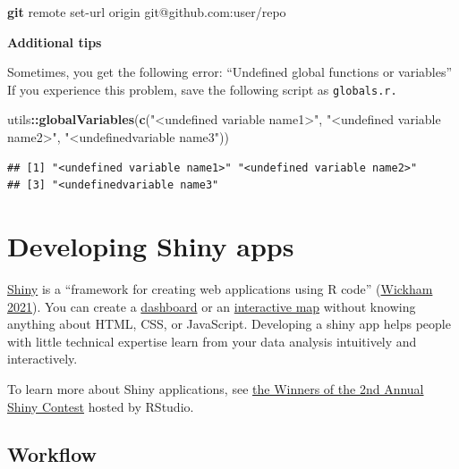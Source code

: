 \documentclass[
]{book}
\newenvironment{Shaded}{\begin{snugshade}}{\end{snugshade}}
\newcommand{\FunctionTok}[1]{\textcolor[rgb]{0.13,0.29,0.53}{\textbf{#1}}}
\newcommand{\NormalTok}[1]{#1}
\newcommand{\SpecialCharTok}[1]{\textcolor[rgb]{0.81,0.36,0.00}{\textbf{#1}}}
\newcommand{\StringTok}[1]{\textcolor[rgb]{0.31,0.60,0.02}{#1}}
\begin{document}
\begin{Shaded}
\begin{Highlighting}[]
\FunctionTok{git}\NormalTok{ remote set{-}url origin git@github.com:user/repo }
\end{Highlighting}
\end{Shaded}

\textbf{Additional tips}

Sometimes, you get the following error: ``Undefined global functions or variables'' If you experience this problem, save the following script as \texttt{globals.r.}

\begin{Shaded}
\begin{Highlighting}[]
\NormalTok{utils}\SpecialCharTok{::}\FunctionTok{globalVariables}\NormalTok{(}\FunctionTok{c}\NormalTok{(}\StringTok{"\textless{}undefined variable name1\textgreater{}"}\NormalTok{, }\StringTok{"\textless{}undefined variable name2\textgreater{}"}\NormalTok{, }\StringTok{"\textless{}undefinedvariable name3"}\NormalTok{))}
\end{Highlighting}
\end{Shaded}

\begin{verbatim}
## [1] "<undefined variable name1>" "<undefined variable name2>"
## [3] "<undefinedvariable name3"
\end{verbatim}

\section{Developing Shiny apps}\label{developing-shiny-apps}

\href{https://shiny.rstudio.com/}{Shiny} is a ``framework for creating web applications using R code'' (\href{https://mastering-shiny.org/}{Wickham 2021}). You can create a \href{https://rstudio.github.io/shinydashboard/}{dashboard} or an \href{https://rviews.rstudio.com/2019/10/09/building-interactive-world-maps-in-shiny/}{interactive map} without knowing anything about HTML, CSS, or JavaScript. Developing a shiny app helps people with little technical expertise learn from your data analysis intuitively and interactively.

To learn more about Shiny applications, see \href{https://blog.rstudio.com/2020/07/13/winners-of-the-2nd-shiny-contest/}{the Winners of the 2nd Annual Shiny Contest} hosted by RStudio.

\subsection{Workflow}\label{workflow-1}
\end{document}
